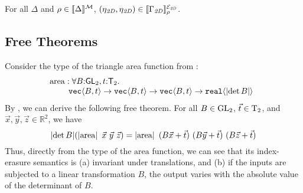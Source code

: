 \begin{lemma}\label{lem:geom-environments-1}
  For all $\Delta$ and $\rho \in \llbracket \Delta \rrbracket^{\mathcal{M}}$, $(\eta_{\mathit{2D}},\eta_{\mathit{2D}}) \in \llbracket \Gamma_{\mathit{2D}} \rrbracket^{\mathcal{\mathcal{E}_{\mathit{2D}}}}_{\mathcal{\rho}}$.
\end{lemma}

\subsection{Free Theorems}
\label{sec:theorems-for-free}

Consider the type of the triangle area %
function from
:
\begin{displaymath}
  \begin{array}{@{}l}
    \mathrm{area} : \forall B\mathord:\SynGL{2}, t\mathord:\SynTransl{2}.\ \\
    \hspace{0.8cm}\tyPrim{vec}{B, t} \to \tyPrim{vec}{B, t} \to \tyPrim{vec}{B, t} \to \tyPrim{real}{\abs{\det B}}
  \end{array}
\end{displaymath}
By , we can derive the following free theorem. For all $B \in \mathrm{GL}_2$, $\vec{t} \in \mathrm{T}_2$, and $\vec{x}, \vec{y}, \vec{z} \in \mathbb{R}^2$, we have 
\begin{displaymath}
  \abs{\det B}(\tmSem{\mathrm{area}}\ \vec{x}\ \vec{y}\ \vec{z}) = \tmSem{\mathrm{area}}\ (B\vec{x} + \vec{t})\ (B\vec{y} + \vec{t})\ (B\vec{z} + \vec{t})
\end{displaymath}
Thus, directly from the type of the $\mathrm{area}$ function, we can
see that its index-erasure semantics is (a) invariant under
translations, and (b) if the inputs are subjected to a linear
transformation $B$, the output varies with the absolute value of the
determinant of $B$.




